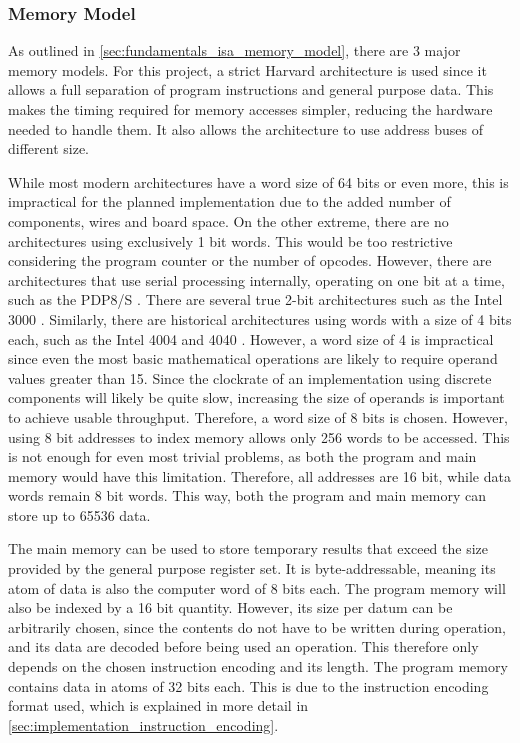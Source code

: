 \subsubsection{Memory Model} \label{sec:implementation_isa_memory_model}

As outlined in \autoref{sec:fundamentals_isa_memory_model}, there are 3 major memory models. For this project, a strict Harvard architecture is used since it allows a full separation of program instructions and general purpose data. This makes the timing required for memory accesses simpler, reducing the hardware needed to handle them. It also allows the architecture to use address buses of different size. 

While most modern architectures have a word size of 64 bits or even more, this is impractical for the planned implementation due to the added number of components, wires and board space. On the other extreme, there are no architectures using exclusively 1 bit words. This would be too restrictive considering the program counter or the number of opcodes. However, there are architectures that use serial processing internally, operating on one bit at a time, such as the PDP8/S \cite{computermuseum_pdp8s}. There are several true 2-bit architectures such as the Intel 3000 \cite{wikichip_intel3000}. Similarly, there are historical architectures using words with a size of 4 bits each, such as the Intel 4004 and 4040 \cite{intel4004history}. However, a word size of 4 is impractical since even the most basic mathematical operations are likely to require operand values greater than 15. Since the clockrate of an implementation using discrete components will likely be quite slow, increasing the size of operands is important to achieve usable throughput. Therefore, a word size of 8 bits is chosen. However, using 8 bit addresses to index memory allows only 256 words to be accessed. This is not enough for even most trivial problems, as both the program and main memory would have this limitation. Therefore, all addresses are 16 bit, while data words remain 8 bit words. This way, both the program and main memory can store up to 65536 data.

The main memory can be used to store temporary results that exceed the size provided by the general purpose register set. It is byte-addressable, meaning its atom of data is also the computer word of 8 bits each. The program memory will also be indexed by a 16 bit quantity. However, its size per datum can be arbitrarily chosen, since the contents do not have to be written during operation, and its data are decoded before being used an operation. This therefore only depends on the chosen instruction encoding and its length. The program memory contains data in atoms of 32 bits each. This is due to the instruction encoding format used, which is explained in more detail in \autoref{sec:implementation_instruction_encoding}.

